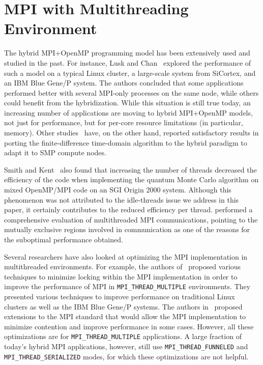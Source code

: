 \section{MPI with Multithreading Environment}\label{sec:related}

The hybrid MPI+OpenMP programming model has been extensively used and
studied in the past.  For instance, Lusk and Chan~\cite{hybrid1} explored the
performance of such a model on a typical Linux cluster, a large-scale
system from SiCortex, and an IBM Blue Gene/P system.  The authors
concluded that some applications performed better with several
MPI-only processes on the same node, while others could benefit from
the hybridization.  While this situation is still true today, an
increasing number of applications are moving to hybrid MPI+OpenMP
models, not just for performance, but for per-core resource
limitations (in particular, memory).  Other studies~\cite{hybrid3}
have, on the other hand, reported satisfactory results in porting the
finite-difference time-domain algorithm to the hybrid paradigm to
adapt it to SMP compute nodes.

Smith and Kent~\cite{hybrid2} also found that increasing the number of threads
decreased the efficiency of the code when implementing the quantum
Monte Carlo algorithm on mixed OpenMP\slash MPI code on an SGI Origin
2000 system.  Although this phenomenon was not attributed to the
idle-threads issue we address in this paper, it certainly contributes
to the reduced efficiency per thread.  \cite{test_hybrid} performed a
comprehensive evaluation of multithreaded MPI communications, pointing
to the mutually exclusive regions involved in communication as one of
the reasons for the suboptimal performance obtained.

Several researchers have also looked at optimizing the MPI
implementation in multithreaded environments.  For example, the
authors of~\cite{balaji08:mpi_threads, dozsa10:mpi_threads_bg, goodell10:threads_resource_contention}
proposed various techniques to minimize locking within the MPI
implementation in order to improve the performance of MPI in
\texttt{MPI\_THREAD\_MULTIPLE} environments.  They presented various
techniques to improve performance on traditional Linux clusters as
well as the IBM Blue Gene/P systems.
The authors in~\cite{dinan13:endpoints} proposed
extensions to the MPI standard that would allow the MPI implementation
to minimize contention and improve performance in some cases.
However, all these optimizations are for
\texttt{MPI\_THREAD\_\linebreak[0]MULTIPLE} applications.  A large
fraction of today's hybrid MPI applications, however, still use
\texttt{MPI\_THREAD\_\linebreak[0]FUNNELED} and
\texttt{MPI\_\linebreak[0]THREAD\_SERIALIZED} modes, for which these
optimizations are not helpful.
